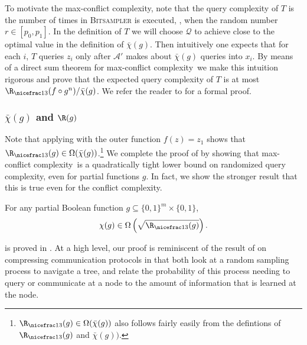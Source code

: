 \documentclass{toc}
\newcommand{\dr}{\nicefrac}
\newcommand{\clQ}{\mathcal{Q}}
\newcommand{\ccc}{max-conflict complexity}
\begin{document}
To motivate the \ccc, note that the query complexity of $T$ is the number of times  in \textsc{Bitsampler} is executed, \ie,  when the random number $r \in [p_0, p_1]$.  In the definition of $T$ we will choose 
$\clQ$ to achieve close to the optimal value in the definition of $\bar \chi(g)$.  Then intuitively one expects that for each $i$, $T$ queries $z_i$ only after $\mathcal{A}'$ makes about $\bar \chi(g)$ queries into $x_i$.     
By means of a direct sum theorem for \ccc \ we make this intuition rigorous and prove that the expected query complexity of $T$ is at most $\R_{\dr13}(f \circ g^n)/ \bar \chi(g)$. 
We refer the reader to  for a formal proof.
%
\subsubsection{\texorpdfstring{$\bar \chi(g)$ and $\R(g)$}{chi-bar(g) and R(g)}}
Note that applying  with the outer function $f(z) = z_1$ shows that $\R_{\dr13}(g) \in \Omega(\bar \chi(g))$.\footnote{$\R_{\dr13}(g) \in \Omega(\bar \chi(g))$ also follows fairly easily from the defintions of $\R_{\dr13}(g)$ and $\bar \chi(g))$.}
We complete the proof of  by showing that \ccc \ is a quadratically tight lower bound on randomized query complexity, even for partial functions $g$.  In fact, we show the stronger result that this is true even for the 
conflict complexity.
\begin{theorem}
\label{mainaStr}
For any partial Boolean function $g \subseteq \{0,1\}^m \times \{0,1\}$,
\[\chi(g)\in\Omega\left(\sqrt{\R_{\dr13}(g)}\right).\]
\end{theorem}
 is proved in . At a high level, our proof is reminiscent of the result of \cite{DBLP:journals/siamcomp/BarakBCR13} on compressing communication protocols in that both look at a random sampling process to navigate a tree, and relate the probability of 
this process needing to query or communicate at a node to the amount of information that is learned at the node. 
\end{document}
